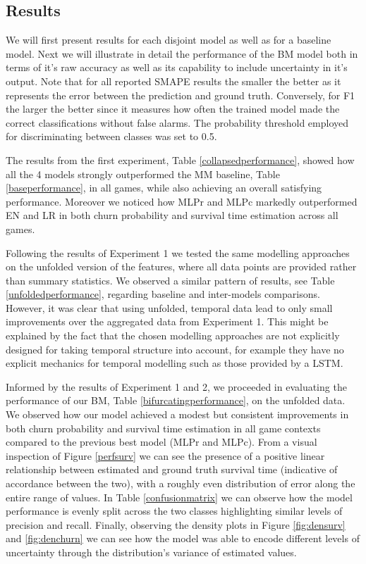 \subsection{Results}
We will first present results for each disjoint model as well as for a baseline model. Next we will illustrate in detail the performance of the BM model both in terms of it's raw accuracy as well as its capability to include uncertainty in it's output. Note that for all reported SMAPE results the smaller the better as it represents the error between the prediction and ground truth. Conversely, for F1 the larger the better since it measures how often the trained model made the correct classifications without false alarms. The probability threshold employed for discriminating between classes was set to 0.5.

The results from the first experiment, Table \ref{collapsedperformance}, showed how all the 4 models strongly outperformed the MM baseline, Table \ref{baseperformance}, in all games, while also achieving an overall satisfying performance. Moreover we noticed how MLPr and MLPc markedly outperformed EN and LR in both churn probability and survival time estimation across all games.  

Following the results of Experiment 1 we tested the same modelling approaches on the unfolded version of the features, where all data points are provided rather than summary statistics. We observed a similar pattern of results, see Table \ref{unfoldedperformance}, regarding baseline and inter-models comparisons. However, it was clear that using unfolded, temporal data lead to only small improvements over the aggregated data from Experiment 1. This might be explained by the fact that the chosen modelling approaches are not explicitly designed for taking temporal structure into account, for example they have no explicit mechanics for temporal modelling such as those provided by a LSTM.

Informed by the results of Experiment 1 and 2, we proceeded in evaluating the performance of our BM, Table \ref{bifurcatingperformance}, on the unfolded data. We observed how our model achieved a modest but consistent improvements in both churn probability and survival time estimation in all game contexts compared to the previous best model (MLPr and MLPc). From a visual inspection of Figure \ref{perfsurv} we can see the presence of a positive linear relationship between estimated and ground truth survival time (indicative of accordance between the two), with a roughly even distribution of error along the entire range of values. In Table \ref{confusionmatrix} we can observe how the model performance is evenly split across the two classes highlighting similar levels of precision and recall. Finally, observing the density plots in Figure \ref{fig:densurv} and \ref{fig:denchurn} we can see how the model was able to encode different levels of uncertainty through the distribution's variance of estimated values.


